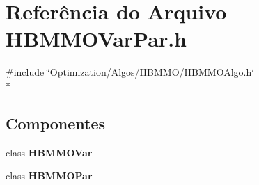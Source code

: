 \section{Referência do Arquivo H\+B\+M\+M\+O\+Var\+Par.\+h}
\label{_h_b_m_m_o_var_par_8h}
{\ttfamily \#include \char`\"{}Optimization/\+Algos/\+H\+B\+M\+M\+O/\+H\+B\+M\+M\+O\+Algo.\+h\char`\"{}}\\*
\subsection*{Componentes}
\begin{DoxyCompactItemize}
\item 
class {\bf H\+B\+M\+M\+O\+Var}
\item 
class {\bf H\+B\+M\+M\+O\+Par}
\end{DoxyCompactItemize}
